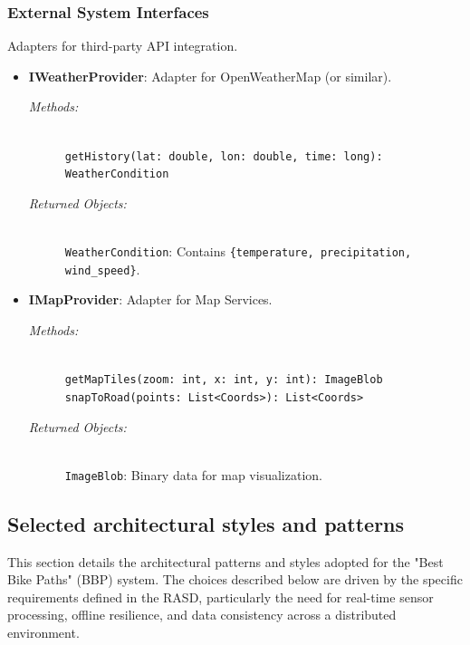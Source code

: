 \clearpage
\subsubsection{External System Interfaces}
Adapters for third-party API integration.

\begin{itemize}
    \item \begin{minipage}[t]{\linewidth}
        \textbf{IWeatherProvider}: Adapter for OpenWeatherMap (or similar).
        \begin{description}
            \item[\textit{Methods:}] \hfill \\
            \texttt{getHistory(lat: double, lon: double, time: long): WeatherCondition}
            \item[\textit{Returned Objects:}] \hfill \\
            \texttt{WeatherCondition}: Contains \texttt{\{temperature, precipitation, wind\_speed\}}.
        \end{description}
    \end{minipage}
    \vspace{0.3cm}

    \item \begin{minipage}[t]{\linewidth}
        \textbf{IMapProvider}: Adapter for Map Services.
        \begin{description}
            \item[\textit{Methods:}] \hfill \\
            \texttt{getMapTiles(zoom: int, x: int, y: int): ImageBlob} \\
            \texttt{snapToRoad(points: List<Coords>): List<Coords>}
            \item[\textit{Returned Objects:}] \hfill \\
            \texttt{ImageBlob}: Binary data for map visualization.
        \end{description}
    \end{minipage}
\end{itemize}
\clearpage

\subsection{Selected architectural styles and patterns}
This section details the architectural patterns and styles adopted for the "Best Bike Paths" (BBP) system. The choices described below are driven by the specific requirements defined in the RASD, particularly the need for real-time sensor processing, offline resilience, and data consistency across a distributed environment.

